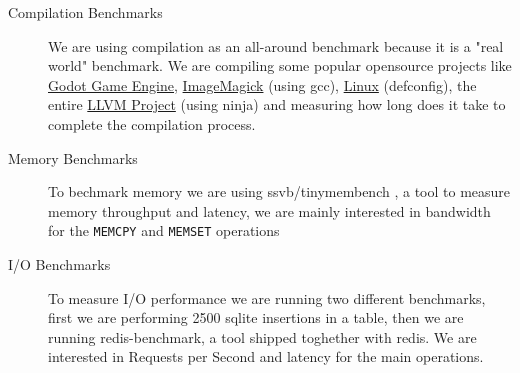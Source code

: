\documentclass[twocolumn]{article}
\begin{document}
\begin{description}
    \item[Compilation Benchmarks] We are using compilation as an all-around benchmark because it is a "real world" benchmark. We are compiling some popular opensource projects like \href{https://github.com/godotengine/godot}{Godot Game Engine}, \href{https://github.com/imagemagick/imagemagick}{ImageMagick} (using gcc), \href{https://git.kernel.org/pub/scm/linux/kernel/git/torvalds/linux.git}{Linux} (defconfig), the entire \href{https://github.com/llvm/llvm-project}{LLVM Project} (using ninja) and measuring how long does it take to complete the compilation process.
    \item[Memory Benchmarks] To bechmark memory we are using ssvb/tinymembench \cite{tinymembench}, a tool to measure memory throughput and latency, we are mainly interested in bandwidth for the \texttt{MEMCPY} and \texttt{MEMSET} operations
    \item[I/O Benchmarks] To measure I/O performance we are running two different benchmarks, first we are performing 2500 sqlite insertions in a table, then we are running redis-benchmark, a tool shipped toghether with redis. We are interested in Requests per Second and latency for the main operations. 
\end{description}
\end{document}
